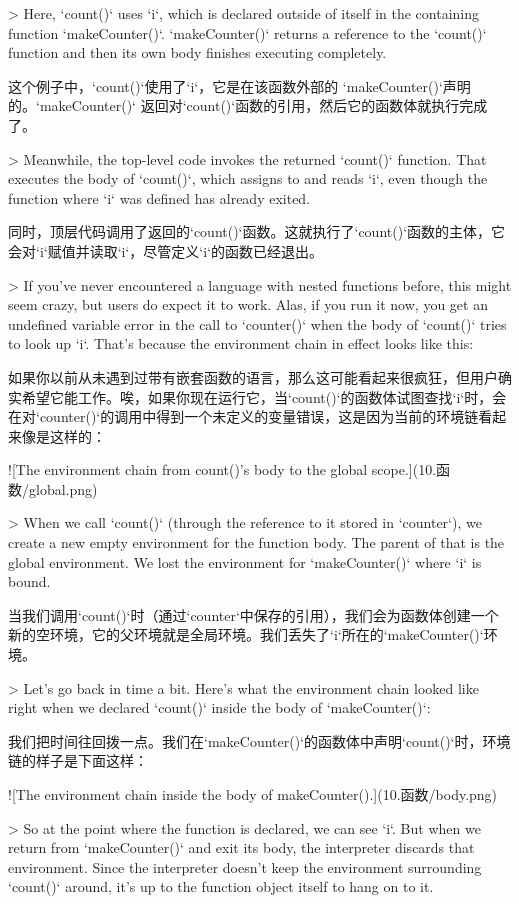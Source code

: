 \documentclass[cn,11pt,chinese]{elegantbook}
\begin{document}
{{{{{{{> Here, `count()` uses `i`, which is declared outside of itself in the containing function `makeCounter()`. `makeCounter()` returns a reference to the `count()` function and then its own body finishes executing completely.

这个例子中，`count()`使用了`i`，它是在该函数外部的 `makeCounter()`声明的。`makeCounter()` 返回对`count()`函数的引用，然后它的函数体就执行完成了。

> Meanwhile, the top-level code invokes the returned `count()` function. That executes the body of `count()`, which assigns to and reads `i`, even though the function where `i` was defined has already exited.

同时，顶层代码调用了返回的`count()`函数。这就执行了`count()`函数的主体，它会对`i`赋值并读取`i`，尽管定义`i`的函数已经退出。

> If you’ve never encountered a language with nested functions before, this might seem crazy, but users do expect it to work. Alas, if you run it now, you get an undefined variable error in the call to `counter()` when the body of `count()` tries to look up `i`. That’s because the environment chain in effect looks like this:

如果你以前从未遇到过带有嵌套函数的语言，那么这可能看起来很疯狂，但用户确实希望它能工作。唉，如果你现在运行它，当`count()`的函数体试图查找`i`时，会在对`counter()`的调用中得到一个未定义的变量错误，这是因为当前的环境链看起来像是这样的：

![The environment chain from count()'s body to the global scope.](10.函数/global.png)

> When we call `count()` (through the reference to it stored in `counter`), we create a new empty environment for the function body. The parent of that is the global environment. We lost the environment for `makeCounter()` where `i` is bound.

当我们调用`count()`时（通过`counter`中保存的引用），我们会为函数体创建一个新的空环境，它的父环境就是全局环境。我们丢失了`i`所在的`makeCounter()`环境。

> Let’s go back in time a bit. Here’s what the environment chain looked like right when we declared `count()` inside the body of `makeCounter()`:

我们把时间往回拨一点。我们在`makeCounter()`的函数体中声明`count()`时，环境链的样子是下面这样：

![The environment chain inside the body of makeCounter().](10.函数/body.png)

> So at the point where the function is declared, we can see `i`. But when we return from `makeCounter()` and exit its body, the interpreter discards that environment. Since the interpreter doesn’t keep the environment surrounding `count()` around, it’s up to the function object itself to hang on to it.

}}}}}}}
\end{document}
